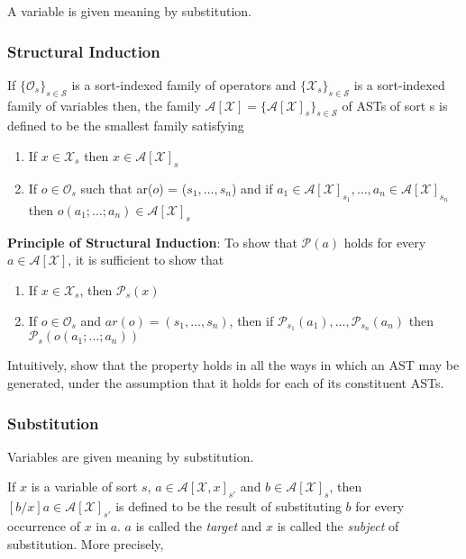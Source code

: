 \documentclass[titlepage, 12pt]{article}
\begin{document}
A variable is given meaning by substitution.

\subsubsection{Structural Induction}
If
$\{\mathcal{O}_s\}_{s\in \mathcal{S}}$ is a sort-indexed family of
		operators and
$\{\mathcal{X}_s\}_{s\in \mathcal{S}}$ is a sort-indexed family of
		variables
then, the family $\mathcal{A}[\mathcal{X}] = \{ \mathcal{A}[\mathcal{X}]_s
\}_{s\in \mathcal{S}}$ of ASTs of sort s is defined to be the smallest family
satisfying

\begin{enumerate}

	\item If $x\in\mathcal{X}_s$ then $x\in \mathcal{A}[\mathcal{X}]_s$

	\item If $o\in \mathcal{O}_s$ such that ar($o$) = ($s_1,\ldots,s_n$) and if
		$a_1\in\mathcal{A}[\mathcal{X}]_{s_1},\ldots,a_n\in\mathcal{A}[\mathcal{X}]_{s_n}$
		then $o(a_1;\ldots;a_n)\in\mathcal{A}[\mathcal{X}]_s$

\end{enumerate}

\textbf{Principle of Structural Induction}: To show that $\mathcal{P}(a)$ holds
for every $a\in\mathcal{A}[\mathcal{X}]$, it is sufficient to show that

\begin{enumerate}

	\item If $x\in\mathcal{X}_s$, then $\mathcal{P}_s(x)$

	\item If $o\in\mathcal{O}_s$ and $ar(o) = (s_1,\ldots,s_n)$, then if
		$\mathcal{P}_{s_1}(a_1),\ldots,\mathcal{P}_{s_n}(a_n)$ then
		$\mathcal{P}_s(o(a_1;\ldots;a_n))$

\end{enumerate}

Intuitively, show that the property holds in all the ways in which an AST may be
generated, under the assumption that it holds for each of its constituent ASTs.

\subsubsection{Substitution}

Variables are given meaning by substitution.

If $x$ is a variable of sort $s$, $a\in\mathcal{A}[\mathcal{X}, x]_{s\prime}$
and $b\in\mathcal{A}[\mathcal{X}]_s$, then
$[b/x]a\in\mathcal{A}[\mathcal{X}]_{s\prime}$ is defined to be the result of
substituting $b$ for every occurrence of $x$ in $a$. $a$ is called the
\textit{target} and $x$ is called the \textit{subject} of substitution. More
precisely,
\end{document}
